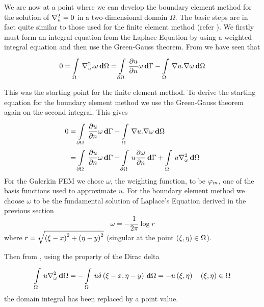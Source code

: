 We are now at a point where we can develop the boundary element method for the
solution of $\laplacian{u} = 0$ in a two-dimensional domain $\Omega$.
The basic steps are in fact quite similar to those used for the finite element
method (refer ).  We firstly must form an integral
equation from the Laplace Equation by using a weighted integral equation and
then use the Green-Gauss theorem.  From  we have
seen that
\begin{equation}
  0 = \goneint{\laplacian{u}.\omega}{\Omega} 
    = \gint{\del \Omega}{}{\delby{u}{n} \omega}{\Gamma}
    - \goneint{\grad u. \grad \omega}{\Omega}
  \label{eqn:2Dbe}
\end{equation}

This was the starting point for the finite element method. To derive the 
starting equation for the boundary element method we use the Green-Gauss 
theorem again on the second integral. This gives
\begin{equation}
  \begin{split}
    0 &= \gint{\del\Omega}{}{\delby{u}{n} \omega}{\Gamma}
    - \goneint{\grad u. \grad \omega}{\Omega} \\
    &= \gint{\del\Omega}{}{\delby{u}{n} \omega}{\Gamma}
    - \gint{\del\Omega}{}{u \delby{\omega}{n}}{\Gamma} 
    + \goneint{u \laplacian{\omega}}{\Omega} 
  \label{eqn:startingeq}
  \end{split}
\end{equation}
For the Galerkin FEM we chose $\omega$, the weighting function, to be $ \varphi_{m} $,
one of the basis functions used to approximate $u$.  For the boundary element
method we choose $\omega$ to be the fundamental solution of Laplace's Equation
derived in the previous section \ie
\begin{equation*}
  \omega = -\dfrac{1}{2\pi} \log r
\end{equation*}
where $r = \sqrt{\left( \xi - x \right)^{2} + \left( \eta - y \right)^{2}}$ (singular at the point
$\left( \xi,\eta \right)\in \Omega$).

Then from , using the property of the Dirac delta
\begin{equation}
  \goneint{u \laplacian{\omega}}{\Omega} = - \goneint{u \fnof{\delta}{\xi -
      x,\eta - y}}{\Omega} = -\fnof{u}{\xi,\eta} \quad \pbrac{\xi,\eta} \in
  \Omega
  \label{eqn:propdd}
\end{equation}
\ie the domain integral has been replaced by a point value.

